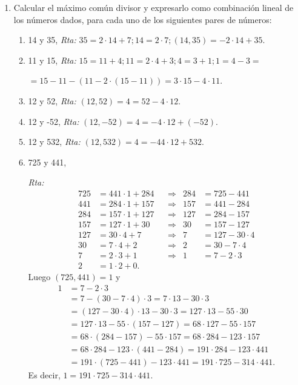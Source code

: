 \documentclass[a4paper,12pt,twoside,spanish,reqno]{amsbook}
\numberwithin{equation}{section}
\newcommand{\rta}{\noindent\textit{Rta: }}
\begin{document}
\begin{enumerate}
\begin{enumerate}

  \end{enumerate}






\item
Calcular el máximo común divisor y expresarlo como combinaci\'on lineal de los
números dados, para cada uno de  los siguientes pares de números:
\begin{enumerate}
    \item     14 y 35, \rta $35=2\cdot14+7; 14=2\cdot7; (14, 35)=-2\cdot 14+35$.
    \item 11 y 15, \rta  $15=11+4; 11=2\cdot4+3; 4=3+1; 1= 4-3=$\par\quad\quad\quad\quad\quad$=15-11- (11-2\cdot(15-11))=3\cdot 15-4\cdot11$.
    \item 12 y 52, \rta  $(12, 52)=4=52-4\cdot12$.
    \item  12 y -52, \rta  $(12, -52)=4=-4\cdot 12+(-52)$.
    \item 12 y 532,  \rta  $ (12,532)=4=-44\cdot 12+532$.
    \item  725 y 441,
    
    \rta \begin{align*}
    725 &= 441 \cdot 1 + 284 &&\Rightarrow& 284 &= 725 - 441 \\
    441 &= 284 \cdot 1 +157 &&\Rightarrow& 157 &= 441-284 \\
    284 &= 157 \cdot 1 + 127 &&\Rightarrow& 127 &=284-157 \\
    157 &= 127 \cdot 1 + 30 &&\Rightarrow& 30 &= 157 - 127 \\
    127 &= 30 \cdot 4  + 7 &&\Rightarrow& 7 &= 127-30 \cdot 4 \\
    30 &= 7 \cdot 4 + 2  &&\Rightarrow& 2 &= 30 -7 \cdot 4 \\
    7 &= 2 \cdot 3 + 1  &&\Rightarrow& 1 &= 7- 2 \cdot 3 \\
    2 &= 1 \cdot 2 + 0.
    \end{align*} 
    Luego $(725,441)=1$ y
    \begin{align*}
    1 &= 7- 2  \cdot 3 \\
    & =  7- (30 -7 \cdot 4)  \cdot 3 = 7 \cdot 13 - 30 \cdot 3 \\
    &= (127-30 \cdot 4 ) \cdot 13 - 30 \cdot 3= 127\cdot 13 - 55 \cdot 30 \\
    &=  127\cdot 13 - 55 \cdot (157 - 127) = 68\cdot 127 - 55\cdot 157 \\
    &=  68\cdot (284-157) - 55\cdot 157 = 68\cdot 284 - 123 \cdot 157 \\
    &= 68\cdot 284 - 123 \cdot (441-284)= 191\cdot 284 - 123\cdot 441\\
    &= 191\cdot (725 - 441) - 123\cdot 441= 191 \cdot 725 - 314 \cdot 441.    
    \end{align*}
    Es decir, $1 = 191 \cdot 725 - 314 \cdot 441$.
    

\end{enumerate}
\end{enumerate}
\end{document}
